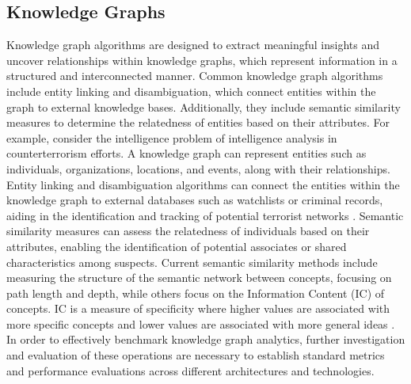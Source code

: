 \documentclass[letterpaper, 10pt]{article}
\begin{document}
\begin{multicols}{2}
{        \subsection{Knowledge Graphs}\label{section:knowledgeGraphs}
            Knowledge graph algorithms are designed to extract meaningful insights and uncover relationships within knowledge graphs, which represent information in a structured and interconnected manner.
            Common knowledge graph algorithms include entity linking and disambiguation, which connect entities within the graph to external knowledge bases. 
            Additionally, they include semantic similarity measures to determine the relatedness of entities based on their attributes.
            For example, consider the intelligence problem of intelligence analysis in counterterrorism efforts. 
            A knowledge graph can represent entities such as individuals, organizations, locations, and events, along with their relationships. 
            Entity linking and disambiguation algorithms can connect the entities within the knowledge graph to external databases such as watchlists or criminal records, aiding in the identification and tracking of potential terrorist networks \cite{Xia2019}. 
            Semantic similarity measures can assess the relatedness of individuals based on their attributes, enabling the identification of potential associates or shared characteristics among suspects. Current semantic similarity methods include  measuring the structure of the semantic network between concepts, focusing on path length and depth, while others focus on the Information Content (IC) of concepts. IC is a measure of specificity where higher values are associated with more specific concepts and lower values are associated with more general ideas \cite{Zhu2016}. 
            In order to effectively benchmark knowledge graph analytics, further investigation and evaluation of these operations are necessary to establish standard metrics and performance evaluations across different architectures and technologies.
            
}
\end{multicols}
\end{document}
